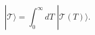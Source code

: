 \begin{equation}
  |\mathcal{T}\rangle = \int_{0}^{\infty} dT\,\,
   |\mathcal{T}(T)\rangle.
\label{eq:tadpole-integral}
\end{equation}

